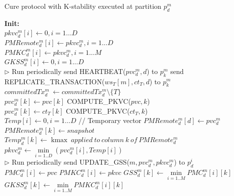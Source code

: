 \documentclass[11pt]{article}
\DeclareMathOperator*{\kmax}{kmax}
\begin{document}
\begin{algorithm}[H]
	\begin{algorithmic}[1]
		\caption{Cure protocol with K-stability executed at partition $p_d^m$}
		\label{algo:kstability-protocol}
		\State \textbf{Init:}\\
		$pkvc^m_d[i] \gets 0, i = 1...D$\\
		$PMRemote_d^m[i] \gets pkvc^m_d, i = 1...D$\\
		$PMKC_d^m[i] \gets pkvc^m_d, i = 1...M$\\
		$GKSS^m_d[i] \gets 0, i = 1...D$\\
					
		 $\triangleright$ Run periodically
					\State send HEARTBEAT($pvc_d^m, d$) to $p_k^m$ \label{algo:send_heartbeat}
				\EndFor
				\Return
			\EndIf
					\State send REPLICATE\_TRANSACTION($ws_T[m],ct_T,d$) to $p_k^m$ 
					\State $committedTx_d^m\ \gets committedTx_d^m\setminus\{T\}$
				\EndFor
			\EndFor
		\EndFunction\\

			\State $pvc_d^m[k] \gets pvc[k]$ \label{algo:heartbeat_update}
			\State COMPUTE\_PKVC($pvc, k$)
		\EndFunction\\

			\State $pvc_d^m[k] \gets ct_T[k]$ \label{algo:remote_tx_update}
			\State COMPUTE\_PKVC($ct_T, k$)
		\EndFunction\\

			\State $Temp[i] \gets 0, i = 1...D$ // Temporary vector
			\State $PMRemote_d^m[d] \gets pvc_d^m$
			\State $PMRemote_d^m[k] \gets snapshot$
				\State $Temp_d^m[k] \gets \kmax\ applied\ to\ column\ k\ of\ PMRemote_d^m$
			\EndFor
			\State $pkvc_d^m \gets \min\limits_{i = 1..D}(pvc_d^m[i], Temp[i])$
		\EndFunction\\

		 $\triangleright$ Run periodically
				\State send UPDATE\_GSS($m, pvc_d^m, pkvc_d^m$) to $p_d^i$
			\EndFor
		\EndFunction\\

			\State $PMC_d^m[i] \gets pvc$
			\State $PMKC_d^m[i] \gets pkvc$
				\State $GSS_d^m[k] \gets \min\limits_{i = 1..M} PMC_d^m[i][k]$
				\State $GKSS_d^m[k] \gets \min\limits_{i = 1..M} PMKC_d^m[i][k]$
			\EndFor
		\EndFunction

	\end{algorithmic}
\end{algorithm}
\end{document}
